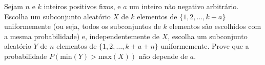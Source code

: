 Sejam \(n\) e \(k\) inteiros positivos fixos, e \(a\) um inteiro não negativo arbitrário. Escolha um subconjunto aleatório \(X\) de \(k\) elementos de \(\{1,2,\dots,k+a\}\) uniformemente (ou seja, todos os subconjuntos de \(k\) elementos são escolhidos com a mesma probabilidade) e, independentemente de \(X\), escolha um subconjunto aleatório \(Y\) de \(n\) elementos de \(\{1,2,\ldots,k+a+n\}\) uniformemente. Prove que a probabilidade
\(P\left( \text{min}(Y)>\text{max}(X)\right)\)
não depende de \(a\).

